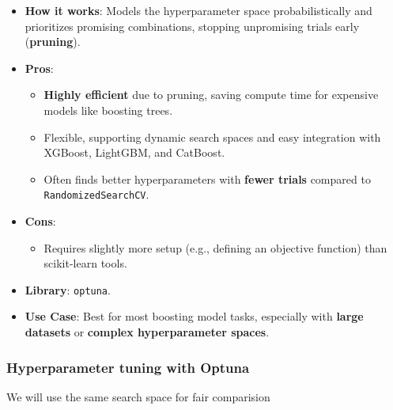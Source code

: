 \documentclass[
  letterpaper,
  DIV=11,
  numbers=noendperiod]{scrreprt}
\providecommand{\tightlist}{%
  \setlength{\itemsep}{0pt}\setlength{\parskip}{0pt}}\usepackage{longtable,booktabs,array}
\begin{document}
\begin{itemize}
\item
  \textbf{How it works}: Models the hyperparameter space
  probabilistically and prioritizes promising combinations, stopping
  unpromising trials early (\textbf{pruning}).
\item
  \textbf{Pros}:

  \begin{itemize}
  \tightlist
  \item
    \textbf{Highly efficient} due to pruning, saving compute time for
    expensive models like boosting trees.
  \item
    Flexible, supporting dynamic search spaces and easy integration with
    XGBoost, LightGBM, and CatBoost.
  \item
    Often finds better hyperparameters with \textbf{fewer trials}
    compared to \texttt{RandomizedSearchCV}.
  \end{itemize}
\item
  \textbf{Cons}:

  \begin{itemize}
  \tightlist
  \item
    Requires slightly more setup (e.g., defining an objective function)
    than scikit-learn tools.
  \end{itemize}
\item
  \textbf{Library}: \texttt{optuna}.
\item
  \textbf{Use Case}: Best for most boosting model tasks, especially with
  \textbf{large datasets} or \textbf{complex hyperparameter spaces}.
\end{itemize}

\subsubsection{Hyperparameter tuning with
Optuna}\label{hyperparameter-tuning-with-optuna}

We will use the same search space for fair comparision
\end{document}
